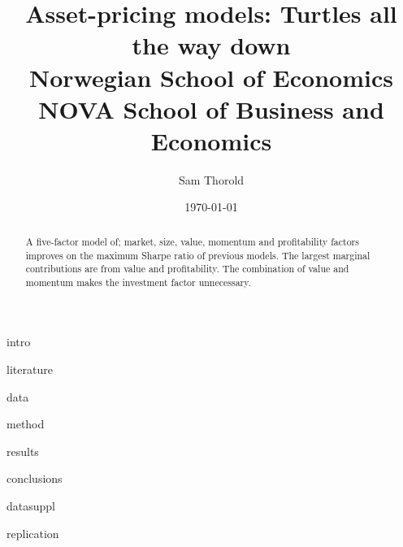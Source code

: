 \documentclass[a4paper, 12pt]{article}
\title{
  {Asset-pricing models: Turtles all the way down}\\
  {\large Norwegian School of Economics}\\
  {\large NOVA School of Business and Economics}
}
\author{Sam Thorold}
\date{\today}
\begin{document}
\maketitle

\begin{abstract}
  A five-factor model of; market, size,  value, momentum and profitability 
  factors improves on the maximum Sharpe ratio of previous models. The largest 
  marginal contributions are from value and profitability. The combination of 
  value and momentum makes the investment factor unnecessary.
\end{abstract}

{intro}

{literature}

{data}

{method}

{results}

{conclusions}

\printbibliography

\appendix

{datasuppl}

{replication}
\end{document}
